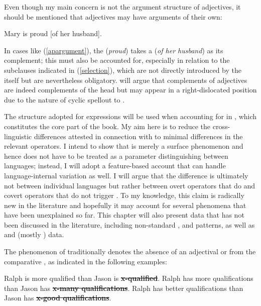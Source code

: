 Even though my main concern is not the argument structure of adjectives, it should be mentioned that adjectives may have arguments of their own:

\ea	Mary is proud [of her husband]. \label{apargument}
\z

In cases like (\ref{apargument}), the  (\textit{proud}) takes a  (\textit{of her husband}) as its complement; this must also be accounted for, especially in relation to the subclauses indicated in (\ref{selection}), which are not directly introduced by the  itself but are nevertheless obligatory.  will argue that  complements of adjectives are indeed complements of the  head but may appear in a right-dislocated position due to the nature of cyclic spellout to .

The structure adopted for  expressions will be used when accounting for  in , which constitutes the core part of the book. My aim here is to reduce the cross-linguistic differences attested in connection with  to minimal differences in the relevant operators. I intend to show that  is merely a surface phenomenon and hence does not have to be treated as a parameter distinguishing between languages; instead, I will adopt a feature-based account that can handle language-internal variation as well. I will argue that the difference is ultimately not between individual languages but rather between overt operators that do and covert operators that do not trigger . To my knowledge, this claim is radically new in the literature and hopefully it may account for several phenomena that have been unexplained so far. This chapter will also present data that has not been discussed in the literature, including non-standard ,  and  patterns, as well as  and  (mostly ) data.

The phenomenon of  traditionally denotes the absence of an adjectival or  from the comparative , as indicated in the following examples:

\ea \label{cd}
\ea	Ralph is more qualified than Jason is \sout{\textbf{x-qualified}}. \label{xqualified}
\ex	Ralph has more qualifications than Jason has \sout{\textbf{x-many qualifications}}. \label{xmanyqualifications}
\ex	Ralph has better qualifications than Jason has \sout{\textbf{x-good qualifications}}. \label{xgoodqualifications}
\z
\z

